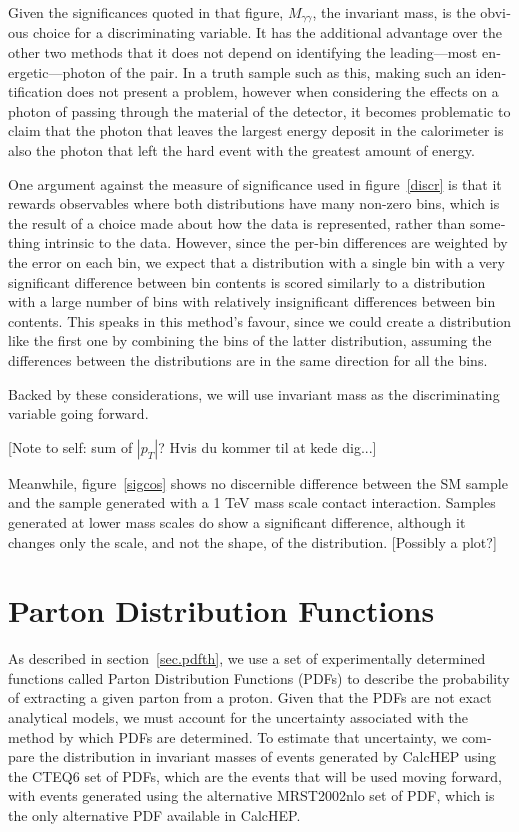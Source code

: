 \begin{english}
Given the significances quoted in that figure, $M_{\gamma\gamma}$, the invariant mass, is the obvious choice for a discriminating variable. It has the additional advantage over the other two methods that it does not depend on identifying the leading---most energetic---photon of the pair. In a truth sample such as this, making such an identification does not present a problem, however when considering the effects on a photon of passing through the material of the detector, it becomes problematic to claim that the photon that leaves the largest energy deposit in the calorimeter is also the photon that left the hard event with the greatest amount of energy.

One argument against the measure of significance used in figure~\ref{discr} is that it rewards observables where both distributions have many non-zero bins, which is the result of a choice made about how the data is represented, rather than something intrinsic to the data. However, since the per-bin differences are weighted by the error on each bin, we expect that a distribution with a single bin with a very significant difference between bin contents is scored similarly to a distribution with a large number of bins with relatively insignificant differences between bin contents. This speaks in this method's favour, since we could create a distribution like the first one by combining the bins of the latter distribution, assuming the differences between the distributions are in the same direction for all the bins.

Backed by these considerations, we will use invariant mass as the discriminating variable going forward.

[Note to self: sum of $|p_T|$? Hvis du kommer til at kede dig...]

Meanwhile, figure~\ref{sigcos} shows no discernible difference between the SM sample and the sample generated with a 1 TeV mass scale contact interaction. Samples generated at lower mass scales do show a significant difference, although it changes only the scale, and not the shape, of the distribution. [Possibly a plot?]

\section{Parton Distribution Functions}
As described in section~\ref{sec.pdfth}, we use a set of experimentally determined functions called Parton Distribution Functions (PDFs) to describe the probability of extracting a given parton from a proton. Given that the PDFs are not exact analytical models, we must account for the uncertainty associated with the method by which  PDFs are determined. To estimate that uncertainty, we compare the distribution in invariant masses of events generated by CalcHEP using the CTEQ6 set of PDFs, which are the events that will be used moving forward, with events generated using the alternative MRST2002nlo set of PDF, which is the only alternative PDF available in CalcHEP.


\end{english}
